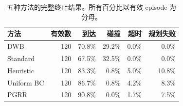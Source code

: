 \begin{table}[htbp]
\centering
\small
\caption{五种方法的完整终止结果。所有百分比以有效 episode 为分母。}
\begin{tabular}{lrrrrr}
\toprule
方法 & 有效数 & 到达 & 碰撞 & 超时 & 规划失败 \\
\midrule
DWB & 120 & 70.8\% & 29.2\% & 0.0\% & 0.0\% \\
Standard & 120 & 67.5\% & 32.5\% & 0.0\% & 0.0\% \\
Heuristic & 120 & 83.3\% & 0.8\% & 5.0\% & 10.8\% \\
Uniform BC & 120 & 86.7\% & 0.8\% & 4.2\% & 8.3\% \\
PGRR & 120 & 90.8\% & 0.0\% & 1.7\% & 7.5\% \\
\bottomrule
\end{tabular}
\end{table}
